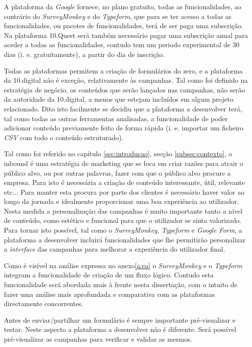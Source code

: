 A plataforma da \textit{Google} fornece, no plano gratuito, todas as funcionalidades, ao contrário do \textit{SurveyMonkey} e do \textit{Typeform}, que para se ter acesso a todas as funcionalidades, ou pacotes de funcionalidades, terá de ser paga uma subscrição. Na plataforma 10.Quest será também necessário pagar uma subscrição anual para aceder a todas as funcionalidades, contudo tem um periodo experimental de 30 dias (i. e. gratuitamente), a partir do dia de inscrição.

Todas as plataformas permitem a criação de formulários do zero, e a plataforma da 10.digital não é exceção, relativamente às campanhas. Tal como foi definido na estratégia de negócio, os conteúdos que serão lançados nas campanhas, não serão da autoridade da 10.digital, a menos que estejam incluídos em algum projeto relacionado. Dito isto facilmente se decidiu que a plataforma a desenvolver terá, tal como todas as outras ferramentas analisadas, a funcionalidade de poder adicionar conteúdo previamente feito de forma rápida (i. e. importar um ficheiro \textit{CSV} com todo o conteúdo estruturado). 


Tal como foi referido no capítulo \ref{sec:introducao}, secção \ref{subsec:contexto}, o inbound é uma estratégia de marketing que se foca em criar razões para atrair o público alvo, ou por outras palavras, fazer com que o público alvo procure a empresa. Para isto é necessária a criação de conteúdo interessante, útil, relevante etc... Para manter esta procura por parte dos clientes é necessário haver valor ao longo da jornada e idealmente proporcionar uma boa experiência ao utilizador. Nesta medida a personalização das campanhas é muito importante tanto a nível de conteúdo, como estético e funcional para que o utilizador se sinta valorizado. Para tornar isto possível, tal como o \textit{SurveyMonkey}, \textit{Typeform} e \textit{Google Form}, a plataforma a desenvolver incluirá funcionalidades que lhe permitirão personalizar a \textit{interface} das campanhas para melhorar a experiência do utilizador final. 

Como é visível na análise expressa no anexo\ref{a:ea} o \textit{SurveyMonkey} e o \textit{Typeform} integram a funcionalidade de criação de um fluxo lógico. Contudo esta funcionalidade será abordada mais à frente nesta dissertação, com o intuito de fazer uma análise  mais aprofundada e comparativa com as plataformas directamente concorrentes.

Antes de enviar/partilhar um formulário é sempre importante pré-visualizar e testar. Neste aspecto a plataforma a desenvolver não é diferente. Será possível pré-visualizar as campanhas para verificar e validar as mesmos. 

